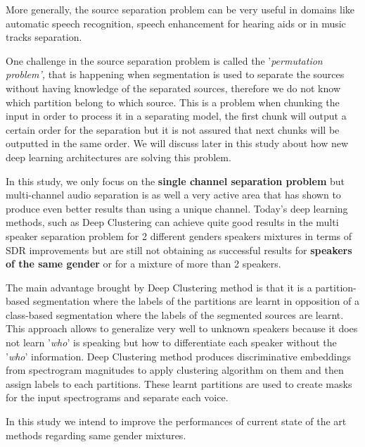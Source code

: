 \documentclass[master, tikz, final,11pt, dvipdfmx]{iscs-thesis}
\begin{document}
More generally, the source separation problem can be very useful in domains like automatic speech recognition, speech enhancement for hearing aids or in music tracks separation.

One challenge in the source separation problem is called the '\textit{permutation problem',} that is happening when segmentation is used to separate the sources without having knowledge of the separated sources, therefore we do not know which partition belong to which source. This is a problem when chunking the input in order to process it in a separating model, the first chunk will output a certain order for the separation but it is not assured that next chunks will be outputted in the same order. We will discuss later in this study about how new deep learning architectures are solving this problem.

In this study, we only focus on the \textbf{single channel separation problem} but multi-channel audio separation is as well a very active area that has shown to produce even better results than using a unique channel. Today's deep learning methods, such as Deep Clustering \cite{DPCLV1, DPCLV2} can achieve quite good results in the multi speaker separation problem for 2 different genders speakers mixtures in terms of SDR improvements but are still not obtaining as successful results for \textbf{speakers of the same gender} or for a mixture of more than 2 speakers. 

The main advantage brought by Deep Clustering \cite{DPCLV1} method is that it is a partition-based segmentation where the labels of the partitions are learnt in opposition of a class-based segmentation where the labels of the segmented sources are learnt. This approach allows to generalize very well to unknown speakers because it does not learn '\textit{who}' is speaking but how to differentiate each speaker without the '\textit{who}' information. Deep Clustering method produces discriminative embeddings from spectrogram magnitudes to apply clustering algorithm on them and then assign labels to each partitions. These learnt partitions are used to create masks for the input spectrograms and separate each voice.

In this study we intend to improve the performances of current state of the art methods regarding same gender mixtures.
\end{document}
